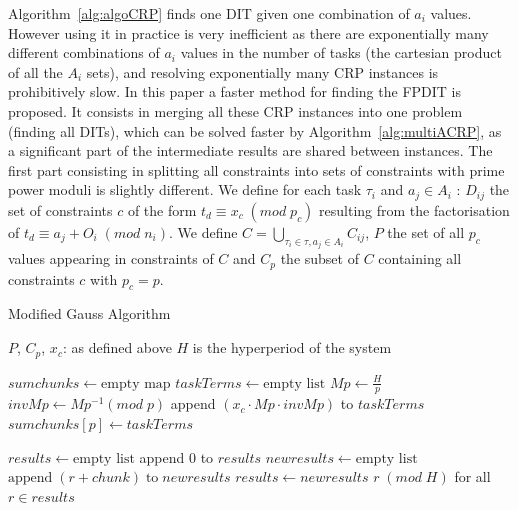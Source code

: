 \documentclass[conference]{IEEEtran}
\begin{document}
		Algorithm~\ref{alg:algoCRP} finds one DIT given one combination of $a_i$
		values. However using it in practice is very inefficient as there are
		exponentially many different combinations of $a_i$ values in the number of
		tasks (the cartesian product of all the $A_i$ sets), and resolving
		exponentially many CRP instances is prohibitively slow.
		In this paper a faster method for finding the FPDIT is proposed. It consists
		in merging all these CRP instances into one problem (finding all DITs), which can be solved faster by
		Algorithm~\ref{alg:multiACRP}, as a significant part of the intermediate
		results are shared between instances. The first part consisting in splitting
		all constraints into sets of constraints with prime power moduli is slightly
		different. We define for each task $\tau_i$ and $a_j \in A_i$ :
		$D_{ij}$ the set of constraints $c$ of the form $t_d \equiv x_c
		\; (mod \; p_c)$ resulting from the factorisation of $t_d
		\equiv a_j+O_i \; (mod \; n_i)$. We define $C = \bigcup\limits_{\tau_i \in \tau,
		a_j \in A_i}{C_{ij}}$, $P$ the set of all $p_c$ values appearing in
		constraints of $C$ and $C_{p}$ the subset of $C$ containing all constraints
		$c$ with $p_c = p$.

		\begin{algorithm}
			\caption{Modified Gauss Algorithm}
			\label{alg:multiACRP}
			\begin{algorithmic}[1]
                \REQUIRE $P$, $C_{p}$, $x_c$: as defined above
				\REQUIRE $H$ is the hyperperiod of the system

				\STATE $sumchunks \leftarrow \text{empty map}$
					\STATE $taskTerms \leftarrow \text{empty list}$
					\STATE $Mp \leftarrow \frac{H}{p}$
					\STATE $invMp \leftarrow Mp^{-1} (mod \; p)$
						\STATE append $(x_c \cdot Mp \cdot invMp)$ to $taskTerms$
					\ENDFOR
					\STATE $sumchunks[p] \leftarrow taskTerms$
				\ENDFOR

				\STATE $results \leftarrow \text{empty list}$
				\STATE append $0$ to $results$
					\STATE $newresults \leftarrow \text{empty list}$
							\STATE $\text{append} \; (r + chunk) \; \text{to} \; newresults$
						\ENDFOR
					\ENDFOR
					\STATE $results \leftarrow newresults$
				\ENDFOR
				\RETURN $r \; (mod \; H)$ for all $r \in results$
			\end{algorithmic}
		\end{algorithm}
\end{document}

